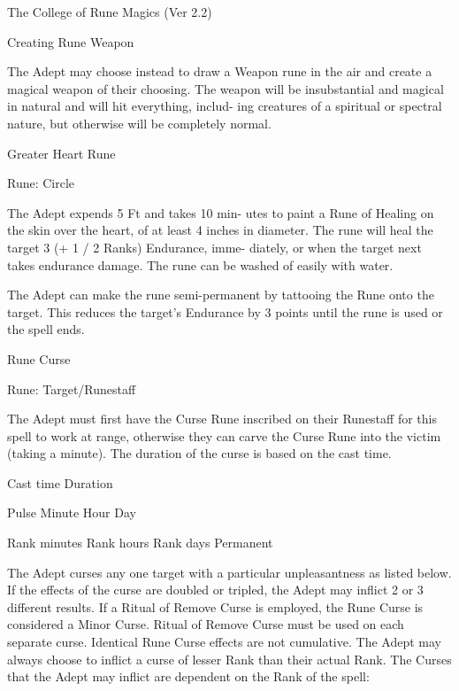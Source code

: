 \begin{Chapter}{The College of Rune Magics (Ver 2.2)}
\begin{spell}[S-4]{Creating Rune Weapon }
\begin{effects}
The  Adept  may  choose  instead  to  draw  a  Weapon 
rune in the air and create a magical weapon of their 
choosing.  The  weapon  will  be  insubstantial  and 
magical  in  natural  and  will  hit  everything,  includ-
ing  creatures  of  a  spiritual  or  spectral  nature,  but 
otherwise will be completely normal. 

\end{effects}
\end{spell}

\begin{spell}[S-5]{Greater Heart Rune }

Rune: Circle 
\begin{effects}
The Adept expends 5 Ft and takes 10 min-
utes to paint a Rune of Healing on the skin over the 
heart, of at least 4 inches in diameter. The rune will 
heal the target 3 (+ 1 / 2 Ranks) Endurance, imme-
diately,  or  when  the  target  next  takes  endurance 
damage.  The  rune  can  be  washed  of  easily  with 
water. 

The  Adept  can  make  the  rune  semi-permanent  by 
tattooing the Rune onto the target. This reduces the 
target’s  Endurance  by  3  points  until  the  rune  is 
used or the spell ends. 

\end{effects}
\end{spell}

\begin{spell}[S-6]{Rune Curse }

Rune: Target/Runestaff 
\begin{effects}
The Adept must first have the Curse Rune 
inscribed  on  their  Runestaff  for  this  spell  to  work 
at range, otherwise they can carve the Curse Rune 
into  the  victim  (taking  a  minute).  The  duration  of 
the curse is based on the cast time. 

Cast time  Duration  

Pulse 
Minute 
Hour 
Day 

Rank minutes  
Rank hours  
Rank days  
Permanent 

The  Adept  curses  any  one  target  with  a  particular 
unpleasantness as listed below. If the effects of the 
curse are doubled or tripled, the Adept may inflict 
2  or  3  different  results.  If  a  Ritual  of  Remove 
Curse is employed, the Rune Curse is considered a 
Minor  Curse.  Ritual  of  Remove  Curse  must  be 
used  on  each  separate  curse.  Identical  Rune  Curse 
effects are not cumulative. The Adept may always 
choose  to  inflict  a  curse  of  lesser  Rank  than  their 
actual Rank. The Curses that the Adept may inflict 
are dependent on the Rank of the spell: 


\end{effects}
\end{spell}
\end{Chapter}
